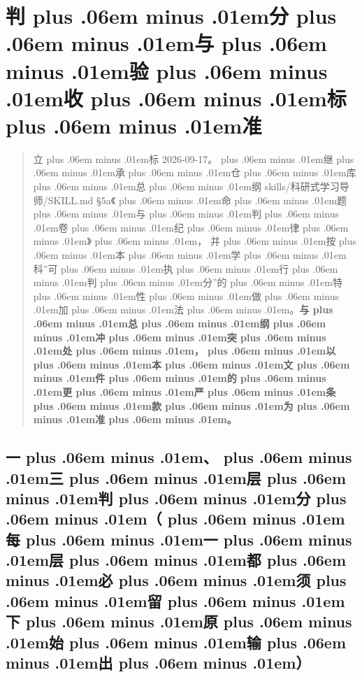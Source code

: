 \documentclass[
]{article}
\newcommand{\passthrough}[1]{#1}
\def\zh#1{{\zhfont #1}}
\def\sym#1{{\symfont #1}}
\def\codezh#1{{\zhmonofont #1}}
\def\zhglue{\hskip0pt plus .06em minus .01em}
\begin{document}
\newpage

\section{\zh{判\zhglue 分\zhglue 与\zhglue 验\zhglue 收\zhglue 标\zhglue 准}}\label{ux5224ux5206ux4e0eux9a8cux6536ux6807ux51c6}

\begin{quote}
\zh{立\zhglue 标} 2026-09-17\zh{。\zhglue 继\zhglue 承\zhglue 仓\zhglue 库\zhglue 总\zhglue 纲} \passthrough{\codezh{skills/{\zh{科}}{\zh{研}}{\zh{式}}{\zh{学}}{\zh{习}}{\zh{导}}{\zh{师}}/SKILL.md}} \sym{§}5a\zh{《\zhglue 命\zhglue 题\zhglue 与\zhglue 判\zhglue 卷\zhglue 纪\zhglue 律\zhglue 》\zhglue ，} \zh{并\zhglue 按\zhglue 本\zhglue 学\zhglue 科}''\zh{可\zhglue 执\zhglue 行\zhglue 判\zhglue 分}''\zh{的\zhglue 特\zhglue 性\zhglue 做\zhglue 加\zhglue 法\zhglue 。}\textbf{\zh{与\zhglue 总\zhglue 纲\zhglue 冲\zhglue 突\zhglue 处\zhglue ，\zhglue 以\zhglue 本\zhglue 文\zhglue 件\zhglue 的\zhglue 更\zhglue 严\zhglue 条\zhglue 款\zhglue 为\zhglue 准\zhglue 。}}
\end{quote}

\subsection{\zh{一\zhglue 、\zhglue 三\zhglue 层\zhglue 判\zhglue 分\zhglue （\zhglue 每\zhglue 一\zhglue 层\zhglue 都\zhglue 必\zhglue 须\zhglue 留\zhglue 下\zhglue 原\zhglue 始\zhglue 输\zhglue 出\zhglue ）}}\label{ux4e00ux4e09ux5c42ux5224ux5206ux6bcfux4e00ux5c42ux90fdux5fc5ux987bux7559ux4e0bux539fux59cbux8f93ux51fa}
\end{document}
